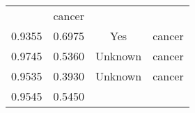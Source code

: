 \documentclass[12pt,]{article}
\begin{document}
\begin{longtable}[]{@{}cccc@{}}
\begin{minipage}[t]{0.22\columnwidth}
\end{minipage} & \begin{minipage}[t]{0.16\columnwidth}\centering\strut
cancer\strut
\end{minipage}\tabularnewline
\begin{minipage}[t]{0.24\columnwidth}\centering\strut
0.9355\strut
\end{minipage} & \begin{minipage}[t]{0.26\columnwidth}\centering\strut
0.6975\strut
\end{minipage} & \begin{minipage}[t]{0.22\columnwidth}\centering\strut
Yes\strut
\end{minipage} & \begin{minipage}[t]{0.16\columnwidth}\centering\strut
cancer\strut
\end{minipage}\tabularnewline
\begin{minipage}[t]{0.24\columnwidth}\centering\strut
0.9745\strut
\end{minipage} & \begin{minipage}[t]{0.26\columnwidth}\centering\strut
0.5360\strut
\end{minipage} & \begin{minipage}[t]{0.22\columnwidth}\centering\strut
Unknown\strut
\end{minipage} & \begin{minipage}[t]{0.16\columnwidth}\centering\strut
cancer\strut
\end{minipage}\tabularnewline
\begin{minipage}[t]{0.24\columnwidth}\centering\strut
0.9535\strut
\end{minipage} & \begin{minipage}[t]{0.26\columnwidth}\centering\strut
0.3930\strut
\end{minipage} & \begin{minipage}[t]{0.22\columnwidth}\centering\strut
Unknown\strut
\end{minipage} & \begin{minipage}[t]{0.16\columnwidth}\centering\strut
cancer\strut
\end{minipage}\tabularnewline
\begin{minipage}[t]{0.24\columnwidth}\centering\strut
0.9545\strut
\end{minipage} & \begin{minipage}[t]{0.26\columnwidth}\centering\strut
0.5450\strut
\end{minipage} & \begin{minipage}[t]{0.22\columnwidth}\centering\strut

\end{minipage}
\end{longtable}
\end{document}
